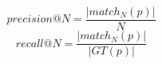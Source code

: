 
\begin{equation} \label{eqn:Precision}
precision@N = \frac{ \left |  match_{N}(p) \right | }{N}
\end{equation}
\begin{equation} \label{eqn:Recall}
recall@N = \frac{ \left |  match_{N}(p) \right | }{\left | GT(p) \right |}	
\end{equation}

